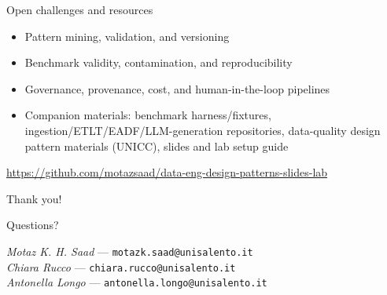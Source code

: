 \documentclass[aspectratio=169]{beamer}
\begin{document}
\begin{frame}{Open challenges and resources}
  \begin{itemize}
    \item Pattern mining, validation, and versioning
    \item Benchmark validity, contamination, and reproducibility
    \item Governance, provenance, cost, and human-in-the-loop pipelines
    \item Companion materials: benchmark harness/fixtures, ingestion/ETLT/EADF/LLM-generation repositories, data-quality design pattern materials (UNICC), slides and lab setup guide
  \end{itemize}
  \vspace{0.5em}
  \centering \url{https://github.com/motazsaad/data-eng-design-patterns-slides-lab}
\end{frame}

\begin{frame}
  \centering Thank you!
  \vspace{1em}

  \small Questions?

  \vspace{1em}
  \textit{Motaz K. H. Saad} --- \texttt{motazk.saad@unisalento.it}\\
  \textit{Chiara Rucco} --- \texttt{chiara.rucco@unisalento.it}\\
  \textit{Antonella Longo} --- \texttt{antonella.longo@unisalento.it}
\end{frame}
\end{document}
